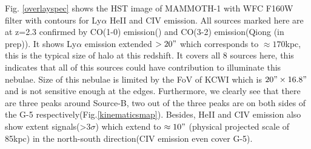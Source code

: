 \documentclass[../Results.tex]{subfiles}
\begin{document}
	Fig. \ref{overlayspec} shows the HST image of MAMMOTH-1 with WFC F160W filter with contours for Ly$\alpha$ HeII and CIV emission. All sources marked here are at z=2.3 confirmed by CO(1-0) emission(\cite{emonts2019cold}) and CO(3-2) emission(Qiong (in prep)). It shows Ly$\alpha$ emission extended $>20"$ which corresponds to $\approx170$kpc, this is the typical size of halo at this redshift. It covers all 8 sources here, this indicates that all of this sources could have contribution to illuminate this nebulae. Size of this nebulae is limited by the FoV of KCWI which is $20" \times 16.8"$ and is not sensitive enough at the edges. Furthermore, we clearly see that there are three peaks around Source-B, two out of the three peaks are on both sides of the G-5 respectively(Fig.\ref{kinematicsmap}). Besides, HeII and CIV emission also show extent signals(>$3\sigma$) which extend to $\approx 10"$ (physical projected scale of 85kpc) in the north-south direction(CIV emission even cover G-5).
	
\end{document}
